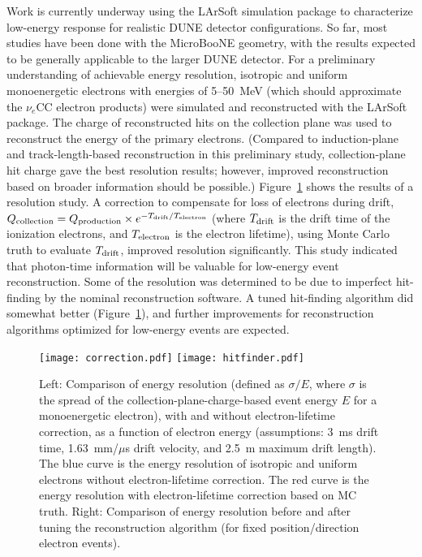 Work is currently underway using the LArSoft simulation package to
characterize low-energy response for realistic DUNE detector
configurations.
So far, most studies have been done with the MicroBooNE geometry, with
the results expected to be generally applicable to the larger DUNE
detector.  For a preliminary understanding of achievable energy
resolution, isotropic and uniform monoenergetic electrons with
energies of 5--50~MeV (which should approximate the $\nu_e$CC
electron products) were simulated and reconstructed with the LArSoft
package.  The charge of reconstructed hits on the collection plane was
used to reconstruct the energy of the primary electrons. (Compared to induction-plane 
and track-length-based reconstruction in
 this preliminary study, collection-plane hit charge gave the best resolution results;
 however, improved reconstruction based on
  broader information should be possible.)
Figure~\ref{fig:lowe_res} shows the results of a resolution study.  
A correction to compensate for loss of electrons during
drift, $Q_{\rm collection}=Q_{\rm production}\times e^{-T_{\rm drift} / T_{\rm
    electron}}$ (where $T_{\rm drift}$ is the drift time of the ionization
electrons, and $T_{\rm electron}$ is the electron lifetime), using Monte
Carlo truth to evaluate $T_{\rm drift}$, improved resolution
significantly.  This study indicated that photon-time information will
be valuable for low-energy event reconstruction.  Some of the
resolution was determined to be due to imperfect hit-finding by the
nominal reconstruction software.  A tuned hit-finding algorithm did
somewhat better (Figure~\ref{fig:lowe_res}), and further improvements
for reconstruction algorithms optimized for low-energy events are
expected.
\begin{figure}[!htb] %
 \centering
\texttt{[image: correction.pdf]} 
\texttt{[image: hitfinder.pdf]} 
 \caption[Comparisons of energy resolution]{Left: Comparison of energy
   resolution (defined as $\sigma/E$, where $\sigma$ is the spread of
   the collection-plane-charge-based event energy $E$ for a
   monoenergetic electron), with and without electron-lifetime
   correction, as a function of electron energy (assumptions: 3~ms
   drift time, 1.63~mm/$\mu$s drift velocity, and 2.5~m maximum drift
   length). The blue curve is the energy resolution of isotropic and
   uniform electrons without electron-lifetime correction. The red
   curve is the energy resolution with electron-lifetime correction
   based on MC truth.  Right: Comparison of energy resolution before
   and after tuning the reconstruction algorithm (for fixed
   position/direction electron events).}\label{fig:lowe_res}
\end{figure}

